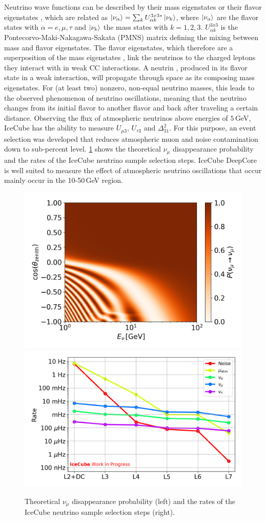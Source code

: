 \documentclass[a4paper,11pt]{article}
\begin{document}
Neutrino wave functions can be described by their mass eigenstates or their flavor eigenstates \cite{BILENKY1978225}, which are related as $\ket{\nu_\alpha} = \sum_kU^{3x3*}_{\alpha k}\ket{\nu_k}$, where $\ket{\nu_\alpha}$ are the flavor states with $\alpha=e,\mu,\tau$ and $\ket{\nu_k}$ the mass states with $k=1,2,3$. $U^{3x3}_{\alpha k}$ is the Pontecorvo-Maki-Nakagawa-Sakata (PMNS) matrix defining the mixing between mass and flavor eigenstates. The flavor eigenstates, which therefore are a superposition of the mass eigenstates \cite{PhysRevD.98.030001}, link the neutrinos to the charged leptons they interact with in weak CC interactions. A neutrin , produced in its flavor state in a weak interaction, will propagate through space as its composing mass eigenstates. For (at least two) nonzero, non-equal neutrino masses, this leads to the observed phenomenon of neutrino oscillations, meaning that the neutrino changes from its initial flavor to another flavor and back after traveling a certain distance. Observing the flux of atmospheric neutrinos above energies of $5\,$GeV, IceCube has the ability to measure $U_{\mu3}$, $U_{\tau3}$ and $\Delta^{2}_{31}$. For this purpose, an event selection was developed that reduces atmospheric muon and noise contamination down to sub-percent level. \cref{fig:oscnext_sample_and_phasespace} shows the theoretical $\nu_{\mu}$ disappearance probability and the rates of the IceCube neutrino sample selection steps. IceCube DeepCore is well suited to measure the effect of atmospheric neutrino oscillations that occur mainly occur in the 10-50\,GeV region.

\begin{figure}[h]
  \includegraphics[width=.44\linewidth]{figures/Oscillogram_numu_numu_orange.png}
  \includegraphics[width=.50\linewidth]{figures/OscNext_high_stats_event_selection_levels.png}
  \caption{Theoretical $\nu_{\mu}$ disappearance probability (left) and the rates of the IceCube neutrino sample selection steps (right).}
  \label{fig:oscnext_sample_and_phasespace}
\end{figure}
\end{document}
